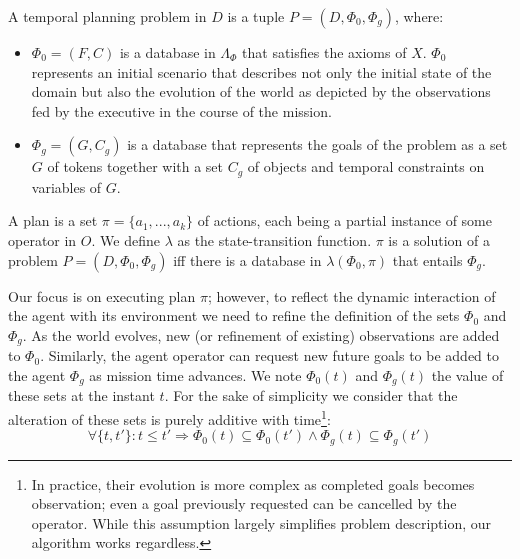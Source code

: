 \begin{definition}
  \label{def:problem}
  A temporal planning problem in $D$ is a tuple $P = ( D, \Phi_0, \Phi_g )$, where:
  \begin{itemize}
  \item $\Phi_0 = (F, C)$ is a database in $\Lambda_\Phi$ that
    satisfies the axioms of $X$.  $\Phi_0$ represents an initial
    scenario that describes not only the initial state of the domain
    but also the evolution of the world as depicted by the
    observations fed by the executive in the course of the mission.
  \item $\Phi_g = (G, C_g)$ is a database that represents the goals of
    the problem as a set $G$ of tokens together with a set $C_g$ of
    objects  and temporal constraints   on variables of $G$.
  \end{itemize}
\end{definition}

\begin{definition}
  \label{def:plan}
  A plan is a set $\pi = \{a_1,...,a_k\}$ of actions, each being a
  partial instance of some operator in $O$.  We define $\lambda$ as
  the state-transition function.  $\pi$ is a solution of a problem $P
  = (D, \Phi_0, \Phi_g)$ iff there is a database in $\lambda(\Phi_0,
  \pi)$ that entails $\Phi_g$.
\end{definition}
 
Our focus is on executing plan $\pi$; however, to reflect the dynamic
interaction of the agent with its environment we need to refine the
definition of the sets $\Phi_0$ and $\Phi_g$. As the world evolves,
new (or refinement of existing) observations are added to
$\Phi_0$. Similarly, the agent operator can request new future goals
to be added to the agent $\Phi_g$ as mission time advances. We note
$\Phi_0(t)$ and $\Phi_g(t)$ the value of these sets at the instant
$t$. For the sake of simplicity we consider that the alteration of
these sets is purely additive with time\footnote{In practice, their
  evolution is more complex as completed goals becomes observation;
  even a goal previously requested can be cancelled by the
  operator. While this assumption largely simplifies problem
  description, our algorithm works regardless.}:
\[ \forall \{t, t'\}: t \le t' \Rightarrow \Phi_0(t) \subseteq \Phi_0(t')
\wedge \Phi_g(t) \subseteq \Phi_g(t') \] 

